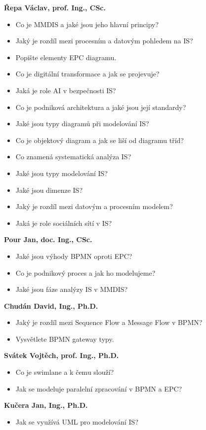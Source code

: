 \begin{profesorbox}
\textbf{Řepa Václav, prof. Ing., CSc.}
\begin{itemize}
  \item Co je MMDIS a jaké jsou jeho hlavní principy?
  \item Jaký je rozdíl mezi procesním a datovým pohledem na IS?
  \item Popište elementy EPC diagramu.
  \item Co je digitální transformace a jak se projevuje?
  \item Jaká je role AI v bezpečnosti IS?
  \item Co je podniková architektura a jaké jsou její standardy?
  \item Jaké jsou typy diagramů při modelování IS?
  \item Co je objektový diagram a jak se liší od diagramu tříd?
  \item Co znamená systematická analýza IS?
  \item Jaké jsou typy modelování IS?
  \item Jaké jsou dimenze IS?
  \item Jaký je rozdíl mezi datovým a procesním modelem?
  \item Jaká je role sociálních sítí v IS?
\end{itemize}
\textbf{Pour Jan, doc. Ing., CSc.}
\begin{itemize}
  \item Jaké jsou výhody BPMN oproti EPC?
  \item Co je podnikový proces a jak ho modelujeme?
  \item Jaké jsou fáze analýzy IS v MMDIS?
\end{itemize}
\textbf{Chudán David, Ing., Ph.D.}
\begin{itemize}
  \item Jaký je rozdíl mezi Sequence Flow a Message Flow v BPMN?
  \item Vysvětlete BPMN gateway typy.
\end{itemize}
\textbf{Svátek Vojtěch, prof. Ing., Ph.D.}
\begin{itemize}
  \item Co je swimlane a k čemu slouží?
  \item Jak se modeluje paralelní zpracování v BPMN a EPC?
\end{itemize}
\textbf{Kučera Jan, Ing., Ph.D.}
\begin{itemize}
  \item Jak se využívá UML pro modelování IS?

\end{itemize}
\end{profesorbox}
